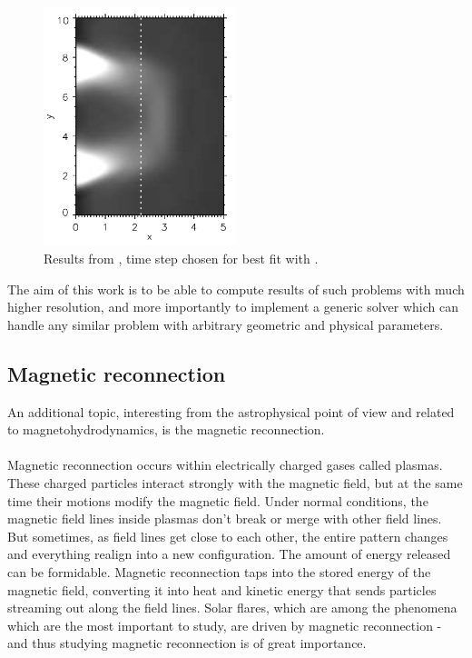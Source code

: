 \begin{figure}[H]
	\begin{center}
		\includegraphics[width=0.5\textwidth]{img/td-setup/fromHalphaResult.jpg}
	\caption{Results from \cite{miraClanek}, time step chosen for best fit with .}
	\label{figure:miraResultToCompare}
	\end{center}
\end{figure}

The aim of this work is to be able to compute results of such problems with much higher resolution, and more importantly to implement a generic solver which can handle any similar problem with arbitrary geometric and physical parameters.

\subsection{Magnetic reconnection}
An additional topic, interesting from the astrophysical point of view and related to magnetohydrodynamics, is the magnetic reconnection.
\paragraph{}
Magnetic reconnection occurs within electrically charged gases called plasmas. These charged particles interact strongly with the magnetic field, but at the same time their motions modify the magnetic field. Under normal conditions, the magnetic field lines inside plasmas don't break or merge with other field lines. But sometimes, as field lines get close to each other, the entire pattern changes and everything realign into a new configuration. The amount of energy released can be formidable. Magnetic reconnection taps into the stored energy of the magnetic field, converting it into heat and kinetic energy that sends particles streaming out along the field lines. Solar flares, which are among the phenomena which are the most important to study, are driven by magnetic reconnection - and thus studying magnetic reconnection is of great importance.
